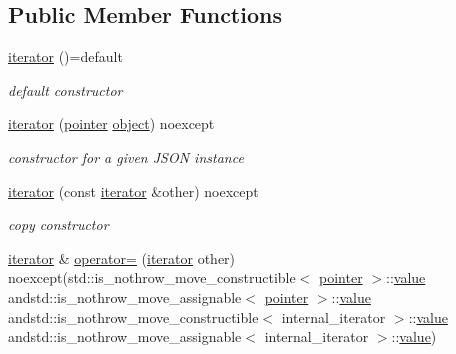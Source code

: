 \subsection*{Public Member Functions}
\begin{DoxyCompactItemize}
\item 
\hyperlink{classnlohmann_1_1basic__json_1_1iterator_a47fb2dbbbfaf65c0ccfa99aeaed920a1}{iterator} ()=default
\begin{DoxyCompactList}\small\item\em default constructor \end{DoxyCompactList}\item 
\hyperlink{classnlohmann_1_1basic__json_1_1iterator_a085fe0d8cf459b5b1ae7b518b933ae7d}{iterator} (\hyperlink{classnlohmann_1_1basic__json_1_1const__iterator_a1da96fc3054d547e7706d3a2f073f389}{pointer} \hyperlink{classnlohmann_1_1basic__json_ad25b2f8c21e241e2d63455537a9294ff}{object}) noexcept
\begin{DoxyCompactList}\small\item\em constructor for a given J\-S\-O\-N instance \end{DoxyCompactList}\item 
\hyperlink{classnlohmann_1_1basic__json_1_1iterator_a1de0975e812c83e74d118b3e1063f335}{iterator} (const \hyperlink{classnlohmann_1_1basic__json_1_1iterator}{iterator} \&other) noexcept
\begin{DoxyCompactList}\small\item\em copy constructor \end{DoxyCompactList}\item 
\hyperlink{classnlohmann_1_1basic__json_1_1iterator}{iterator} \& \hyperlink{classnlohmann_1_1basic__json_1_1iterator_a28e1e3ea6f52ab57f1a2fd98f6ab5d9c}{operator=} (\hyperlink{classnlohmann_1_1basic__json_1_1iterator}{iterator} other) noexcept(std\-::is\-\_\-nothrow\-\_\-move\-\_\-constructible$<$ \hyperlink{classnlohmann_1_1basic__json_1_1const__iterator_a1da96fc3054d547e7706d3a2f073f389}{pointer} $>$\-::\hyperlink{classnlohmann_1_1basic__json_1_1iterator_a8ffbf287736048e683f58306fdb8701f}{value} andstd\-::is\-\_\-nothrow\-\_\-move\-\_\-assignable$<$ \hyperlink{classnlohmann_1_1basic__json_1_1const__iterator_a1da96fc3054d547e7706d3a2f073f389}{pointer} $>$\-::\hyperlink{classnlohmann_1_1basic__json_1_1iterator_a8ffbf287736048e683f58306fdb8701f}{value} andstd\-::is\-\_\-nothrow\-\_\-move\-\_\-constructible$<$ internal\-\_\-iterator $>$\-::\hyperlink{classnlohmann_1_1basic__json_1_1iterator_a8ffbf287736048e683f58306fdb8701f}{value} andstd\-::is\-\_\-nothrow\-\_\-move\-\_\-assignable$<$ internal\-\_\-iterator $>$\-::\hyperlink{classnlohmann_1_1basic__json_1_1iterator_a8ffbf287736048e683f58306fdb8701f}{value})

\end{DoxyCompactItemize}
